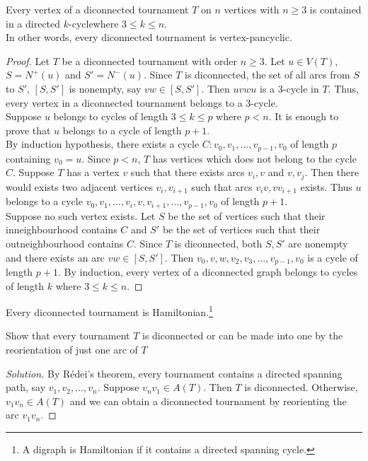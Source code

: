 \begin{theorem}[Moon]
	Every vertex of a diconnected tournament $T$ on $n$ vertices with $n \ge 3$ is contained in a directed $k$-cyclewhere $3 \le k \le n$.\\ In other words, every diconnected tournament is vertex-pancyclic.
\end{theorem}
\begin{proof}
	Let $T$ be a diconnected tournament with order $n \ge 3$. Let $u \in V(T)$, $S = N^+(u)$ and $S' = N^-(u)$. Since $T$ is diconnected, the set of all arcs from $S$ to $S'$, $[S,S']$ is nonempty, say $vw \in [S,S']$. Then $uvwu$ is a $3$-cycle in $T$. Thus, every vertex in a diconnected tournament belongs to a $3$-cycle.\\

	Suppose $u$ belongs to cycles of length $3 \le k \le p$ where $p < n$. It is enough to prove that $u$ belongs to a cycle of length $p+1$.\\

	By induction hypothesis, there exists a cycle $C : v_0,v_1,\dots,v_{p-1},v_0$ of length $p$ containing $v_0 = u$. Since $p < n$, $T$ has vertices which does not belong to the cycle $C$. Suppose $T$ has a vertex $v$ such that there exists arcs $v_i,v$ and $v,v_j$. Then there would exists two adjacent vertices $v_i,v_{i+1}$ such that arcs $v_iv,vv_{i+1}$ exists. Thus $u$ belongs to a cycle $v_0,v_1,\dots,v_i,v,v_{i+1},\dots,v_{p-1},v_0$ of length $p+1$.\\

	Suppose	no such vertex exists. Let $S$ be the set of vertices such that their inneighbourhood contains $C$ and $S'$ be the set of vertices such that their outneighbourhood contains $C$. Since $T$ is diconnected, both $S,S'$ are nonempty and there exists an arc $vw \in [S,S']$. Then $v_0,v,w,v_2,v_3,\dots,v_{p-1},v_0$ is a cycle of length $p+1$. By induction, every vertex of a diconnected graph belongs to cycles of length $k$ where $3 \le k \le n$.
\end{proof}

\begin{remark}
	Every diconnected tournament is Hamiltonian.\footnote{A digraph is Hamiltonian if it contains a directed spanning cycle.}
\end{remark}

\begin{exercise}
	Show that every tournament $T$ is diconnected or can be made into one by the reorientation of just one arc of $T$
\end{exercise}
\begin{proof}[Solution]
	By R\'edei's theorem, every tournament contains a directed spanning path, say $v_1,v_2,\dots,v_n$. Suppose $v_nv_1 \in A(T)$. Then $T$ is diconnected. Otherwise, $v_1v_n \in A(T)$ and we can obtain a diconnected tournament by reorienting the arc $v_1v_n$.
\end{proof}

